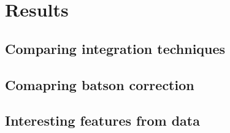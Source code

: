 \section{Results}
\subsection{Comparing integration techniques}
\subsection{Comapring batson correction}
\subsection{Interesting features from data}